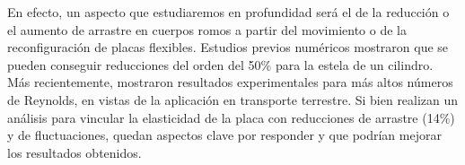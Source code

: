 \documentclass[12pt]{article}
\begin{document}
En efecto, un aspecto que estudiaremos en profundidad será el de la reducción o el aumento de arrastre en cuerpos romos a partir del movimiento o de la reconfiguración de placas flexibles\cite{gosselin2010drag}. Estudios previos numéricos\cite{wu2016characteristics} mostraron que se pueden conseguir reducciones del orden del 50\% para la estela de un cilindro. Más recientemente, \citet{garcia2021drag} mostraron resultados experimentales para más altos números de Reynolds, en vistas de la aplicación en transporte terrestre. Si bien realizan un análisis para vincular la elasticidad de la placa con reducciones de arrastre (14\%) y de fluctuaciones, quedan aspectos clave por responder y que podrían mejorar los resultados obtenidos.


\begin{small}
	
\end{small}
\end{document}
